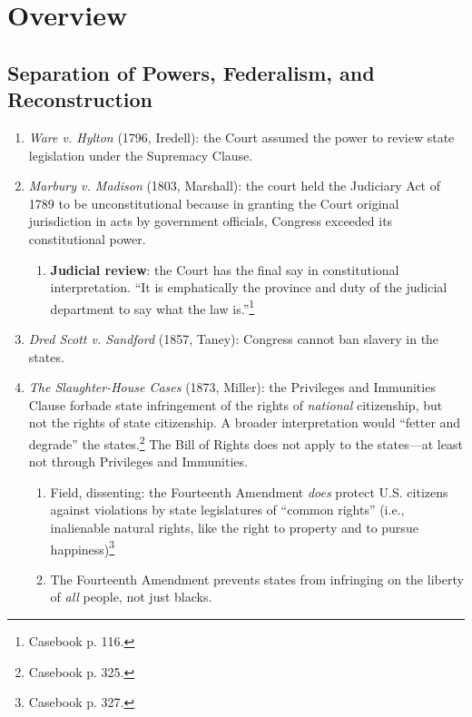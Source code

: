 \section{Overview}

\subsection{Separation of Powers, Federalism, and Reconstruction}

\begin{enumerate}
    \item \emph{Ware v. Hylton} (1796, Iredell): the Court assumed the power 
    to review state legislation under the Supremacy Clause.
    \item \emph{Marbury v. Madison} (1803, Marshall): the court held the 
    Judiciary Act of 1789 to be unconstitutional because in granting the Court 
    original jurisdiction in acts by government officials, Congress exceeded 
    its constitutional power.
    \begin{enumerate}
        \item \textbf{Judicial review}: the Court has the final say in 
        constitutional interpretation.  ``It is emphatically the province and 
        duty of the judicial department to say what the law 
        is.''\footnote{Casebook p. 116.}
    \end{enumerate}
    \item \emph{Dred Scott v. Sandford} (1857, Taney): Congress cannot ban 
    slavery in the states.
    \item \emph{The Slaughter-House Cases} (1873, Miller): the Privileges and 
    Immunities Clause forbade state infringement of the rights of 
    \emph{national} citizenship, but not the rights of state citizenship. A 
    broader interpretation would ``fetter and degrade'' the 
    states.\footnote{Casebook p. 325.} The Bill of Rights does not apply to 
    the states---at least not through Privileges and Immunities.
    \begin{enumerate}
        \item Field, dissenting: the Fourteenth Amendment \emph{does} protect 
        U.S. citizens against violations by state legislatures of ``common 
        rights'' (i.e., inalienable natural rights, like the right to property 
        and to pursue happiness)\footnote{Casebook p. 327.}
        \item The Fourteenth Amendment prevents states from infringing on the 
        liberty of \emph{all} people, not just blacks.

\end{enumerate}
\end{enumerate}
